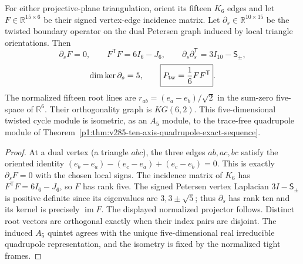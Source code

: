 \documentclass[11pt]{article}
\begin{document}
\begin{corollary}
\label{p1:cor:kneser-twisted-cycle-root-bridge}
For either projective-plane triangulation, orient its fifteen
$K_6$ edges and let $F\in\mathbb R^{15\times6}$ be their signed
vertex-edge incidence matrix. Let $\partial_s\in\mathbb R^{10\times15}$
be the twisted boundary operator on the dual Petersen graph induced by
local triangle orientations. Then
\[
 \partial_sF=0,\qquad F^{\mathsf T}F=6I_6-J_6,\qquad
 \partial_s\partial_s^{\mathsf T}=3I_{10}-\mathsf S_\pm,
\]
\[
 \dim\ker\partial_s=5,\qquad
 \boxed{P_{\rm tw}=\frac16FF^{\mathsf T}}.
\]
The normalized fifteen root lines are
$r_{ab}=(e_a-e_b)/\sqrt2$ in the sum-zero five-space of
$\mathbb R^6$. Their orthogonality graph is $KG(6,2)$.
This five-dimensional twisted cycle module is isometric, as an
$A_5$ module, to the trace-free quadrupole module of
Theorem~\ref{p1:thm:v285-ten-axis-quadrupole-exact-sequence}.
\end{corollary}
\begin{proof}
At a dual vertex (a triangle $abc$), the three edges
$ab,ac,bc$ satisfy the oriented identity
$(e_b-e_a)-(e_c-e_a)+(e_c-e_b)=0$.
This is exactly $\partial_sF=0$ with the chosen local signs.
The incidence matrix of $K_6$ has
$F^{\mathsf T}F=6I_6-J_6$, so $F$ has rank five.
The signed Petersen vertex Laplacian $3I-\mathsf S_\pm$ is positive
definite since its eigenvalues are $3,3\pm\sqrt5$;
thus $\partial_s$ has rank ten and its kernel is precisely
$\operatorname{im}F$. The displayed normalized projector follows.
Distinct root vectors are orthogonal exactly when their index pairs
are disjoint. The induced $A_5$ quintet agrees with the unique
five-dimensional real irreducible quadrupole representation, and the
isometry is fixed by the normalized tight frames.
\end{proof}
\end{document}

